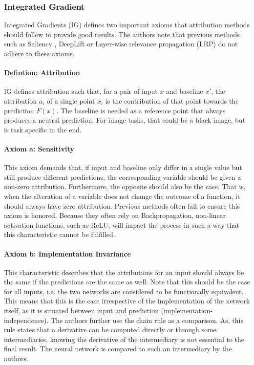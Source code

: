 \subsubsection{Integrated Gradient}

Integrated Gradients (IG) defines two important axioms that attribution methods should follow to provide good results. The authors note that previous methods such as Saliency \cite{Simonyan2013Deep}, DeepLift \cite{Shrikumar2016Not} or Layer-wise relevance propagation (LRP) \cite{Bach2015Pixel} do not adhere to these axioms.

\paragraph{Defintion: Attribution}

IG defines attribution such that, for a pair of input \(x\) and baseline \(x'\), the attribution \(a_i\) of a single point \(x_i\) is the contribution of that point towards the prediction \(F(x)\). The baseline is needed as a reference point that always produces a neutral prediction. For image tasks, that could be a black image, but is task specific in the end.

\paragraph{Axiom a: Sensitivity}

This axiom demands that, if input and baseline only differ in a single value but still produce different predictions, the corresponding variable should be given a non-zero attribution. Furthermore, the opposite should also be the case. That is, when the alteration of a variable does not change the outcome of a function, it should always have zero attribution.  
Previous methods often fail to ensure this axiom is honored. Because they often rely on Backpropagation, non-linear activation functions, such as ReLU, will impact the process in such a way that this characteristic cannot be fulfilled. \cite{Sundararajan2017Axiomatic}

\paragraph{Axiom b: Implementation Invariance}

This characteristic describes that the attributions for an input should always be the same if the predictions are the same as well. Note that this should be the case for all inputs, i.e. the two networks are considered to be functionally equivalent. This means that this is the case irrespective of the implementation of the network itself, as it is situated between input and prediction (implementation-independence). The authors further use the chain rule as a comparison. \cite{Sundararajan2017Axiomatic} As, this rule states that a derivative can be computed directly or through some intermediaries, knowing the derivative of the intermediary is not essential to the final result. The neural network is compared to such an intermediary by the authors.

